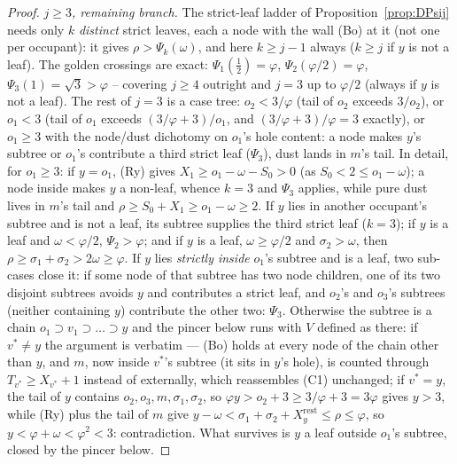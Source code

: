 \documentclass[10pt,a4paper]{amsart}
\begin{document}
\begin{proof}
\emph{$j\ge3$, remaining branch.} The strict-leaf ladder of
Proposition~\ref{prop:DPsij} needs only $k$ \emph{distinct} strict
leaves, each a node with the wall (Bo) at it (not one per occupant):
it gives $\rho>\Psi_k(\omega)$, and here $k\ge j-1$ always ($k\ge j$ if
$y$ is not a leaf). The golden
crossings are exact: $\Psi_1(\tfrac12)=\varphi$,
$\Psi_2(\varphi/2)=\varphi$, $\Psi_3(1)=\sqrt3>\varphi$ -- covering
$j\ge4$ outright and $j=3$ up to $\varphi/2$ (always if $y$ is not a
leaf). The rest of $j=3$ is a case tree: $o_2<3/\varphi$ (tail of
$o_2$ exceeds $3/o_2$), or $o_1<3$ (tail of $o_1$ exceeds
$(3/\varphi+3)/o_1$, and $(3/\varphi+3)/\varphi=3$ exactly), or
$o_1\ge3$ with the node/dust dichotomy on $o_1$'s hole content: a node
makes $y$'s subtree or $o_1$'s contribute a third strict leaf
($\Psi_3$), dust lands in $m$'s tail. In detail, for $o_1\ge3$: if
$y=o_1$, (Ry) gives $X_1\ge o_1-\omega-S_0>0$ (as $S_0<2\le o_1-\omega$);
a node inside makes $y$ a non-leaf, whence $k=3$ and $\Psi_3$ applies,
while pure dust lives in $m$'s tail and
$\rho\ge S_0+X_1\ge o_1-\omega\ge2$. If $y$ lies in another
occupant's subtree and is not a leaf, its subtree supplies the third
strict leaf ($k=3$); if $y$ is a leaf and $\omega<\varphi/2$,
$\Psi_2>\varphi$; and if $y$ is a leaf, $\omega\ge\varphi/2$ and
$\sigma_2>\omega$, then
$\rho\ge\sigma_1+\sigma_2>2\omega\ge\varphi$. If $y$ lies
\emph{strictly inside} $o_1$'s subtree and is a leaf, two sub-cases
close it: if some node of that subtree has two node children, one of
its two disjoint subtrees avoids $y$ and contributes a strict leaf,
and $o_2$'s and $o_3$'s subtrees (neither containing $y$) contribute
the other two: $\Psi_3$. Otherwise the subtree is a chain
$o_1\supset v_1\supset\dots\supset y$ and the pincer below runs with
$V$ defined as there: if $v^{*}\ne y$ the argument is verbatim ---
(Bo) holds at every node of the chain other than $y$, and $m$, now
inside $v^{*}$'s subtree (it sits in $y$'s hole), is counted through
$T_{v^{*}}\ge X_{v^{*}}+1$ instead of externally, which reassembles
(C1) unchanged; if $v^{*}=y$, the tail of $y$ contains
$o_2,o_3,m,\sigma_1,\sigma_2$, so
$\varphi y>o_2+3\ge3/\varphi+3=3\varphi$ gives $y>3$, while (Ry) plus
the tail of $m$ give
$y-\omega<\sigma_1+\sigma_2+X_y^{\mathrm{rest}}\le\rho\le\varphi$, so
$y<\varphi+\omega<\varphi^2<3$: contradiction. What survives is
$y$ a leaf outside $o_1$'s subtree, closed by the pincer below.


\end{proof}
\end{document}
